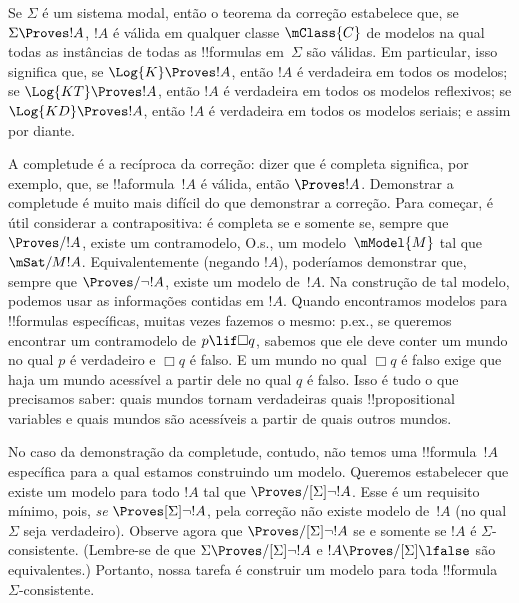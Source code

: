 \documentclass[../../../include/open-logic-section]{subfiles}
\begin{document}


Se $\Sigma$ é um sistema modal, então o teorema da correção estabelece
que, se $\Sigma \Proves !A$, $!A$ é válida em qualquer classe
$\mClass{C}$ de modelos na qual todas as instâncias de todas as
!!{formula}s em~$\Sigma$ são válidas. Em particular, isso significa
que, se $\Log{K} \Proves !A$, então $!A$ é verdadeira em todos os
modelos; se $\Log{KT} \Proves !A$, então $!A$ é verdadeira em todos os
modelos reflexivos; se $\Log{KD} \Proves !A$, então $!A$ é verdadeira
em todos os modelos seriais; e assim por diante.

A completude é a recíproca da correção: dizer que  é completa
significa, por exemplo, que, se !!a{formula}~$!A$ é válida, então
$\Proves !A$. Demonstrar a completude é muito mais difícil do que
demonstrar a correção. Para começar, é útil considerar a
contrapositiva:  é completa se e somente se, sempre que
$\Proves/ !A$, existe um contramodelo, O.s.\@, um modelo~$\mModel{M}$
tal que $\mSat/{M}{!A}$. Equivalentemente (negando $!A$), poderíamos
demonstrar que, sempre que $\Proves/ \lnot !A$, existe um modelo
de~$!A$. Na construção de tal modelo, podemos usar as informações
contidas em $!A$. Quando encontramos modelos para !!{formula}s
específicas, muitas vezes fazemos o mesmo: p.ex., se queremos
encontrar um contramodelo de $p \lif \Box q$, sabemos que ele deve
conter um mundo no qual $p$ é verdadeiro e $\Box q$ é falso. E um
mundo no qual $\Box q$ é falso exige que haja um mundo acessível a
partir dele no qual $q$ é falso. Isso é tudo o que precisamos saber:
quais mundos tornam verdadeiras quais !!{propositional variable}s e
quais mundos são acessíveis a partir de quais outros mundos.

No caso da demonstração da completude, contudo, não temos uma
!!{formula}~$!A$ específica para a qual estamos construindo um modelo.
Queremos estabelecer que existe um modelo para todo $!A$ tal que
$\Proves/[\Sigma] \lnot !A$. Esse é um requisito mínimo, pois,
\emph{se} $\Proves[\Sigma] \lnot !A$, pela correção não existe modelo
de~$!A$ (no qual $\Sigma$ seja verdadeiro). Observe agora que
$\Proves/[\Sigma] \lnot !A$ se e somente se $!A$ é
$\Sigma$-consistente. (Lembre-se de que $\Sigma
\Proves/[\Sigma] \lnot !A$ e $!A \Proves/[\Sigma] \lfalse$ são
equivalentes.) Portanto, nossa tarefa é construir um modelo para toda
!!{formula} $\Sigma$-consistente.
\end{document}
